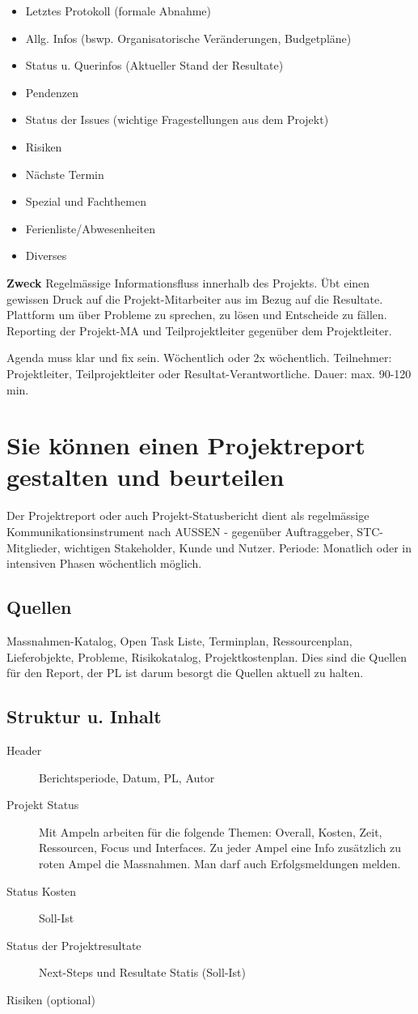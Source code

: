 \begin{itemize}
	\item Letztes Protokoll (formale Abnahme)
	\item Allg. Infos (bswp. Organisatorische Veränderungen, Budgetpläne)
	\item Status u. Querinfos (Aktueller Stand der Resultate)
	\item Pendenzen
	\item Status der Issues (wichtige Fragestellungen aus dem Projekt)
	\item Risiken
	\item Nächste Termin
	\item Spezial und Fachthemen
	\item Ferienliste/Abwesenheiten
	\item Diverses
\end{itemize}

\textbf{Zweck} Regelmässige Informationsfluss innerhalb des Projekts. Übt einen gewissen Druck auf die Projekt-Mitarbeiter aus im Bezug auf die Resultate. Plattform um über Probleme zu sprechen, zu lösen und Entscheide zu fällen. Reporting der Projekt-MA und Teilprojektleiter gegenüber dem Projektleiter.

Agenda muss klar und fix sein. Wöchentlich oder 2x wöchentlich. Teilnehmer: Projektleiter, Teilprojektleiter oder Resultat-Verantwortliche. Dauer: max. 90-120 min.

\section{Sie können einen Projektreport gestalten und beurteilen}
Der Projektreport oder auch Projekt-Statusbericht dient als regelmässige Kommunikationsinstrument nach AUSSEN - gegenüber Auftraggeber, STC-Mitglieder, wichtigen Stakeholder, Kunde und Nutzer. Periode: Monatlich oder in intensiven Phasen wöchentlich möglich.

\subsection{Quellen}
Massnahmen-Katalog, Open Task Liste, Terminplan, Ressourcenplan, Lieferobjekte, Probleme, Risikokatalog, Projektkostenplan. Dies sind die Quellen für den Report, der PL ist darum besorgt die Quellen aktuell zu halten.

\subsection{Struktur u. Inhalt}
\begin{description}
	\item [Header] Berichtsperiode, Datum, PL, Autor
	\item [Projekt Status] Mit Ampeln arbeiten für die folgende Themen: Overall, Kosten, Zeit, Ressourcen, Focus und Interfaces. Zu jeder Ampel eine Info zusätzlich zu roten Ampel die Massnahmen. Man darf auch Erfolgsmeldungen melden.
	\item [Status Kosten] Soll-Ist
	\item [Status der Projektresultate] Next-Steps und Resultate Statis (Soll-Ist)
	\item [Risiken (optional)]
\end{description}
